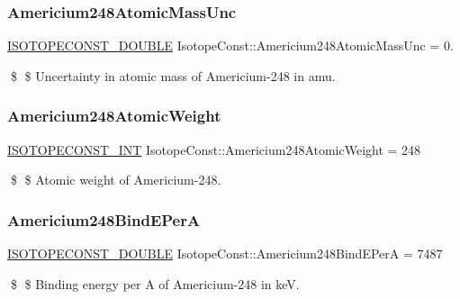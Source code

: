 \subsubsection{\texorpdfstring{Americium248\+Atomic\+Mass\+Unc}{Americium248AtomicMassUnc}}
{\footnotesize\ttfamily \mbox{\hyperlink{group___isotope_const-_macros_ga8f45a7272ce02c0b4c65c44636ed719a}{I\+S\+O\+T\+O\+P\+E\+C\+O\+N\+S\+T\+\_\+\+D\+O\+U\+B\+LE}} Isotope\+Const\+::\+Americium248\+Atomic\+Mass\+Unc = 0.}

\$ \$ Uncertainty in atomic mass of Americium-\/248 in amu. \mbox{\label{group___isotope_const-_americium-_am248_ga8e96b48456df41e8ab94bbe695a8761f}} 
\subsubsection{\texorpdfstring{Americium248\+Atomic\+Weight}{Americium248AtomicWeight}}
{\footnotesize\ttfamily \mbox{\hyperlink{group___isotope_const-_macros_ga5f18360b3e99483a35c32d789e62621c}{I\+S\+O\+T\+O\+P\+E\+C\+O\+N\+S\+T\+\_\+\+I\+NT}} Isotope\+Const\+::\+Americium248\+Atomic\+Weight = 248}

\$ \$ Atomic weight of Americium-\/248. \mbox{\label{group___isotope_const-_americium-_am248_ga220dd08f633dfaa9faec7c7703c679b7}} 
\subsubsection{\texorpdfstring{Americium248\+Bind\+E\+PerA}{Americium248BindEPerA}}
{\footnotesize\ttfamily \mbox{\hyperlink{group___isotope_const-_macros_ga8f45a7272ce02c0b4c65c44636ed719a}{I\+S\+O\+T\+O\+P\+E\+C\+O\+N\+S\+T\+\_\+\+D\+O\+U\+B\+LE}} Isotope\+Const\+::\+Americium248\+Bind\+E\+PerA = 7487}

\$ \$ Binding energy per A of Americium-\/248 in keV. \mbox{\label{group___isotope_const-_americium-_am248_gac1c82d00aa7ba8c0ac836ce7bd6a246d}} 
